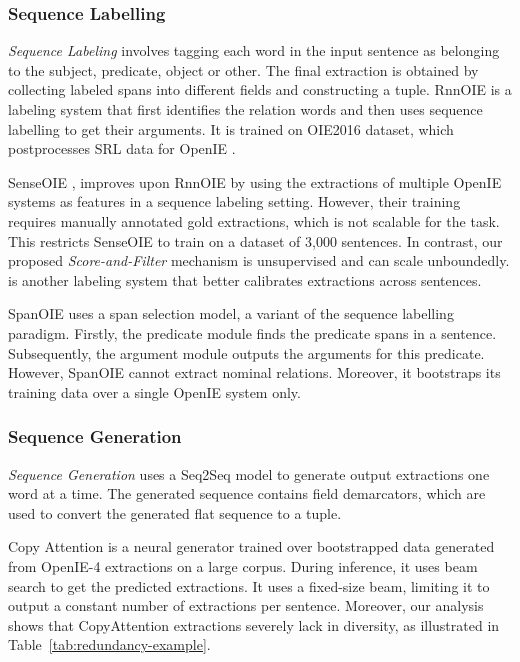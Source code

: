         \subsubsection{Sequence Labelling}
            \emph{Sequence Labeling} involves tagging each word in the input sentence as belonging to the subject, predicate, object or other. The final extraction is obtained by collecting labeled spans into different fields and constructing a tuple. RnnOIE \citep{stanovsky&al18} is a labeling system that first identifies the relation words and then uses sequence labelling to get their arguments. It is trained on OIE2016 dataset, which postprocesses SRL data for OpenIE \citep{Stanovsky2016EMNLP}.

            SenseOIE \citep{roy&al19}, improves upon RnnOIE by using the extractions of multiple OpenIE systems as features in a sequence labeling setting. However, their training requires manually annotated gold extractions, which is not scalable for the task. This restricts SenseOIE to train on a dataset of 3,000 sentences. In contrast, our proposed \textit{Score-and-Filter} mechanism is unsupervised and can scale unboundedly. \citet{jiang12019improving} is another labeling system that better calibrates extractions across sentences.
    
            SpanOIE \citep{zhan&al19} uses a span selection model, a variant of the sequence labelling paradigm. Firstly, the predicate module finds the predicate spans in a sentence. Subsequently, the argument module outputs the arguments for this predicate. However, SpanOIE cannot extract nominal relations. Moreover, it bootstraps its training data over a single OpenIE system only.

        \subsubsection{Sequence Generation}
            \emph{Sequence Generation} uses a Seq2Seq model to generate output extractions one word at a time. The generated sequence contains field demarcators, which are used to convert the generated flat sequence to a tuple.
            
            Copy Attention \citep{cui&al18} is a neural generator trained over bootstrapped data generated from OpenIE-4 extractions on a large corpus. During inference, it uses beam search to get the predicted extractions. It uses a fixed-size beam, limiting it to output a constant number of extractions per sentence. Moreover, our analysis shows that CopyAttention extractions severely lack in diversity, as illustrated in Table~\ref{tab:redundancy-example}.
            
